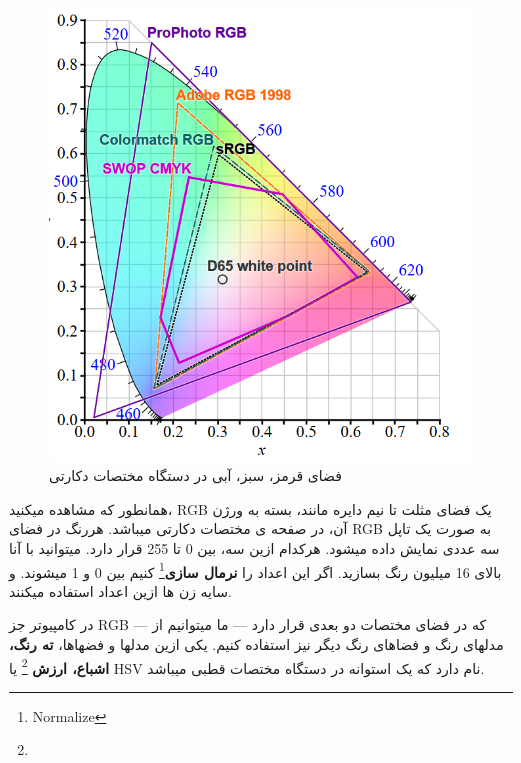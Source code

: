 \documentclass[14pt,a4paper]{memoir}
\begin{document}
\begin{figure}[H]
	\centering
	\includegraphics[scale=0.6]{RGBModel}
	\caption{فضای قرمز، سبز، آبی در دستگاه مختصات دکارتی}
\end{figure}

همانطور که مشاهده میکنید، RGB یک فضای مثلت تا نیم دایره مانند، بسته به ورژن آن، در صفحه ی مختصات دکارتی میباشد. هررنگ در فضای RGB به صورت یک تاپل سه عددی  نمایش داده میشود. هرکدام ازین سه، بین 0 تا 255 قرار دارد. میتوانید با آنا بالای 16 میلیون رنگ بسازید. اگر این اعداد را \textbf{نرمال سازی}\footnote{Normalize} کنیم بین 0 و 1 میشوند. و سایه زن ها ازین اعداد استفاده میکنند. 

در کامپیوتر جز RGB  --- که در فضای مختصات دو بعدی قرار دارد --- ما میتوانیم از مدلهای رنگ و فضاهای رنگ دیگر نیز استفاده کنیم. یکی ازین مدلها و فضهاها، \textbf{ته رنگ، اشباع، ارزش }\footnote{}  یا HSV نام دارد که یک استوانه در دستگاه مختصات قطبی میباشد.
\end{document}
